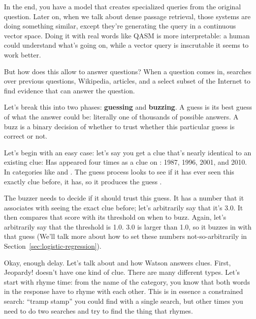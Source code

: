 
In the end, you have a model that creates specialized queries from the
original question.
%
Later on, when we talk about dense passage
retrieval, those systems are doing something similar, except they’re
generating the query in a continuous vector space.
%
Doing it with real words like QASM is more interpretable: a human could
understand what’s going on, while a vector query is inscrutable it seems to
work better.

But how does this allow \watson{} to answer questions?
%
When a question comes in, \watson{} searches over previous \jeopardy{}
questions, Wikipedia, articles, and a select subset of the Internet to find
evidence that can answer the question.

Let's break this into two phases: {\bf guessing} and {\bf buzzing}.
%
A guess is its best guess of what the answer could be: literally one of
thousands of possible answers.
%
A buzz is a binary decision of whether to trust whether this particular guess
is correct or not.

Let's begin with an easy case: let's say you get a clue that's nearly
identical to an existing clue:
Has appeared four times as a clue on \jeopardy{}: 1987, 1996, 2001, and 2010.
%
In categories like  and .
%
The guess process looks to see if it has ever seen this exactly clue before,
it has, so it produces the guess .

The buzzer needs to decide if it should trust this guess.
%
It has a number that it associates with seeing the exact clue before; let's
arbitrarily say that it's 3.0.  It then compares that score with its threshold
on when to buzz.  Again, let's arbitrarily say that the threshold is 1.0.  3.0
is larger than 1.0, so it buzzes in with that guess (We'll talk more about how to set these numbers not-so-arbitrarily in
Section~\ref{sec:logistic-regression}).





Okay, enough delay.  Let’s talk about \jeopardy{} and how Watson
answers \jeopardy{} clues.  First, Jeopardy! doesn’t have one kind of
clue.  There are many different types.  Let’s start with rhyme time:
from the name of the category, you know that both words in the
response have to rhyme with each other.
%
This is in essence a
constrained search: ``tramp stamp'' you could find with a single search,
but other times you need to do two searches and try to find the thing
that rhymes.

